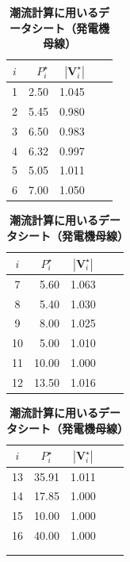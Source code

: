 \documentclass[tombow,dvipdfmx]{corona-a5-1.1}
\begin{document}
\begin{table}[h]
\medskip
\caption{\textbf{潮流計算に用いるデータシート（発電機母線）}} \label{table:ieee68datag}
 \centering
  {
  \begin{minipage}{0.32\linewidth}
    \centering
  \begin{tabular}{crrcc}
   \hline
$i$ & $P_i^{\star}$  &  $|\bm{V}_i^{\star} |$ \\
   \hline \hline
1  & \multicolumn{1}{r}{2.50}   & \multicolumn{1}{r}{1.045} \\
2  & \multicolumn{1}{r}{5.45}   & \multicolumn{1}{r}{0.980} \\
3  & \multicolumn{1}{r}{6.50}   & \multicolumn{1}{r}{0.983} \\
4  & \multicolumn{1}{r}{6.32}   & \multicolumn{1}{r}{0.997} \\
5  & \multicolumn{1}{r}{5.05}   & \multicolumn{1}{r}{1.011} \\
6  & \multicolumn{1}{r}{7.00}   & \multicolumn{1}{r}{1.050} \\
   \hline
  \end{tabular}
  \end{minipage}
  \begin{minipage}{0.32\linewidth}
    \centering
  \begin{tabular}{ccccc}
   \hline
$i$ & $P_i^{\star}$  &  $|\bm{V}_i^{\star} |$ \\
   \hline \hline
7  & \multicolumn{1}{r}{5.60}   & \multicolumn{1}{r}{1.063} \\
8  & \multicolumn{1}{r}{5.40}   & \multicolumn{1}{r}{1.030} \\
9  & \multicolumn{1}{r}{8.00}   & \multicolumn{1}{r}{1.025} \\
10 & \multicolumn{1}{r}{5.00}   & \multicolumn{1}{r}{1.010} \\
11 & \multicolumn{1}{r}{10.00}   & \multicolumn{1}{r}{1.000} \\
12 & \multicolumn{1}{r}{13.50}   & \multicolumn{1}{r}{1.016} \\
   \hline
  \end{tabular}
  \end{minipage}
    \begin{minipage}{0.32\linewidth}
    \centering
  \begin{tabular}{ccccc}
   \hline
$i$ & $P_i^{\star}$  &  $|\bm{V}_i^{\star} |$ \\
   \hline \hline
13  & \multicolumn{1}{r}{35.91}   & \multicolumn{1}{r}{1.011} \\
14  & \multicolumn{1}{r}{17.85}   & \multicolumn{1}{r}{1.000} \\
15  & \multicolumn{1}{r}{10.00}   & \multicolumn{1}{r}{1.000} \\
16  & \multicolumn{1}{r}{40.00}   & \multicolumn{1}{r}{1.000} \\
\\
\\
   \hline
  \end{tabular}
  \end{minipage}
  }
\end{table}
 
\end{document}
